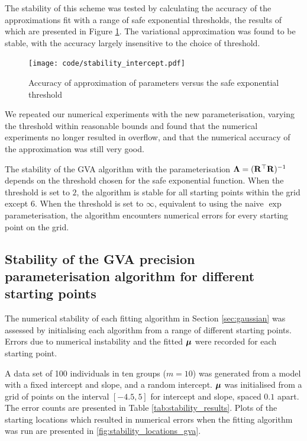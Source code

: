 The stability of this scheme was tested by calculating the accuracy of the approximations fit with a
range of safe exponential thresholds, the results of which are presented in Figure
\ref{fig:stability_accuracy}. The variational approximation was found to be stable, with the accuracy
largely insensitive to the choice of threshold.

\begin{figure}[h]
	\texttt{[image: code/stability\_intercept.pdf]}
	\label{fig:stability_accuracy}
	\caption{Accuracy of approximation of parameters versus the safe exponential threshold}
\end{figure}

We repeated our numerical experiments with the new parameterisation, varying the threshold within
reasonable bounds and found that the numerical experiments no longer resulted in overflow, and that the
numerical accuracy of the approximation was still very good.

The stability of the GVA algorithm with the parameterisation ${\boldsymbol \Lambda} = ({\bf R}^\top {\bf R})^{-1}$ depends on
the threshold chosen for the safe exponential function. When the threshold is set to $2$, the algorithm
is stable for all starting points within the grid except $6$. When the threshold is set to $\infty$,
equivalent to using the naive $\exp$ parameterisation, the algorithm encounters numerical errors for
every starting point on the  grid.
	
\subsection{Stability of the GVA precision parameterisation algorithm for different starting points}
		
The numerical stability of each fitting algorithm in Section \ref{sec:gaussian} was assessed by
initialising each algorithm from a range of different starting points. Errors due to numerical
instability and the fitted ${\boldsymbol \mu}$ were recorded for each starting point.
		
A data set of 100 individuals in ten groups ($m=10$) was generated from a model with a fixed intercept
and slope, and a random intercept. ${\boldsymbol \mu}$ was initialised from a grid of points on the interval $[-4.5,
5]$ for intercept and slope, spaced $0.1$ apart. The error counts are presented in Table
\ref{tab:stability_results}. Plots of the starting locations which resulted in numerical errors when the
fitting algorithm was run are presented in \ref{fig:stability_locations_gva}.
		
